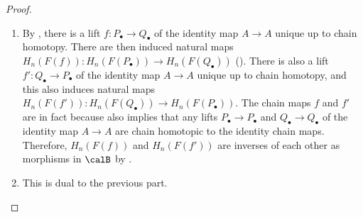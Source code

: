 \begin{proof}
    \begin{enumerate}
        \item By , there is a lift $f: P_\bullet \to Q_\bullet$ of the identity map $A \to A$ unique up to chain homotopy. There are then induced natural maps $H_n(F(f)): H_n(F(P_\bullet)) \to H_n(F(Q_\bullet))$ (). There is also a lift $f': Q_\bullet \to P_\bullet$ of the identity map $A \to A$ unique up to chain homotopy, and this also induces natural maps $H_n(F(f')): H_n(F(Q_\bullet)) \to H_n(F(P_\bullet))$. The chain maps $f$ and $f'$ are in fact  because  also implies that any lifts $P_\bullet \to P_\bullet$ and $Q_\bullet \to Q_\bullet$ of the identity map $A \to A$ are chain homotopic to the identity chain maps. Therefore, $H_n(F(f))$ and $H_n(F(f'))$ are inverses of each other as morphisms in $\calB$ by .

        \item This is dual to the previous part.
    \end{enumerate}
\end{proof}
